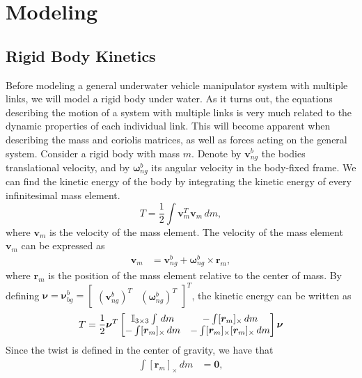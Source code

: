 \chapter{Modeling}
\label{ch:modeling}

\section{Rigid Body Kinetics}

Before modeling a general underwater vehicle manipulator system with multiple links, we will model
a rigid body under water. As it turns out, the equations describing the motion
of a system with multiple links is very much related to the dynamic properties
of each individual link. This will become apparent when describing the mass
and coriolis matrices, as well as forces acting on the general system.
Consider a rigid body with mass $m$. Denote by $\bm{v}_{ng}^b$ the bodies translational
velocity, and by $\bm{\omega}_{ng}^b$ its angular velocity in the
body-fixed frame. We can find the kinetic energy of the body by integrating the
kinetic energy of every infinitesimal mass element.
\begin{equation}
    T = \frac{1}{2} \int \bm{v}_m^T \bm{v}_m\, dm,
\end{equation}
where $\bm{v}_m$ is the velocity of the mass element.
The velocity of the mass element $\bm{v}_m$ can be expressed as
\begin{align}
    \bm{v}_m &= \bm{v}_{ng}^b + \bm{\omega}_{ng}^b \times \bm{r}_m,
\end{align}
where $\bm{r}_m$ is the position of the mass element relative to the center of
mass. By defining $\bm{\nu} = \bm{\nu}_{bg}^b = \begin{bmatrix}(\bm{v}_{ng}^b)^T & (\bm{\omega}_{ng}^b)^T \end{bmatrix}^T$, the kinetic energy can be written as
\begin{align}
    T = \frac{1}{2} \bm{\nu}^T
    \begin{bmatrix}
        \mathbb{I}_{3\times 3} \int \,dm & - \int [\bm{r}_m]_\times \,dm \\
        - \int [\bm{r}_m]_\times \,dm & -\int [\bm{r}_m]_\times [\bm{r}_m]_\times \,dm
    \end{bmatrix}
    \bm{\nu}\label{eq:T_body}
\end{align}
Since the twist is defined in the center of gravity, we have that
\begin{align}
    \int [\bm{r}_m]_{\times} \,dm &= \bm{0},
\end{align}
